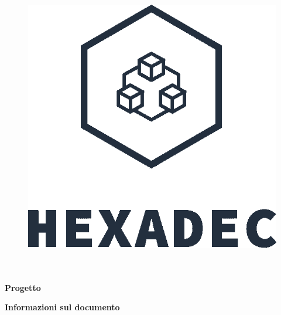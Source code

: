 \thispagestyle{empty}
\begin{figure}
	\centering
	\includegraphics[scale=0.4]{../../template/images/logo}
\end{figure}



\hspace{5pt}
\begin{center}
\HRule \\[0.4cm]

\textbf{\Large \huge \color{LogoColor}{\documentName}}\\[0.2cm]

\textbf{\Large \huge  Progetto \projectName}
\HRule \\[0.4cm]
\end{center}
	
\vspace{5pt}

\begin{center}
	\groupEmail
\end{center}

\vspace{5pt}

\begin{center}
	\textbf {\Large Informazioni sul documento}
	
\end{center}

